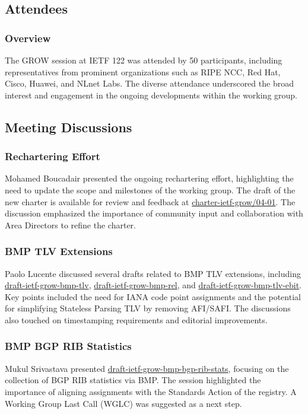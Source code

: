 \documentclass{article}
\begin{document}
\subsection{Attendees}
\subsubsection{Overview}
The GROW session at IETF 122 was attended by 50 participants, including representatives from prominent organizations such as RIPE NCC, Red Hat, Cisco, Huawei, and NLnet Labs. The diverse attendance underscored the broad interest and engagement in the ongoing developments within the working group.

\subsection{Meeting Discussions}

\subsubsection{Rechartering Effort}
Mohamed Boucadair presented the ongoing rechartering effort, highlighting the need to update the scope and milestones of the working group. The draft of the new charter is available for review and feedback at \href{https://datatracker.ietf.org/doc/charter-ietf-grow/04-01/}{charter-ietf-grow/04-01}. The discussion emphasized the importance of community input and collaboration with Area Directors to refine the charter.

\subsubsection{BMP TLV Extensions}
Paolo Lucente discussed several drafts related to BMP TLV extensions, including \href{https://datatracker.ietf.org/doc/html/draft-ietf-grow-bmp-tlv}{draft-ietf-grow-bmp-tlv}, \href{https://datatracker.ietf.org/doc/html/draft-ietf-grow-bmp-rel}{draft-ietf-grow-bmp-rel}, and \href{https://datatracker.ietf.org/doc/html/draft-ietf-grow-bmp-tlv-ebit}{draft-ietf-grow-bmp-tlv-ebit}. Key points included the need for IANA code point assignments and the potential for simplifying Stateless Parsing TLV by removing AFI/SAFI. The discussions also touched on timestamping requirements and editorial improvements.

\subsubsection{BMP BGP RIB Statistics}
Mukul Srivastava presented \href{https://datatracker.ietf.org/doc/html/draft-ietf-grow-bmp-bgp-rib-stats}{draft-ietf-grow-bmp-bgp-rib-stats}, focusing on the collection of BGP RIB statistics via BMP. The session highlighted the importance of aligning assignments with the Standards Action of the registry. A Working Group Last Call (WGLC) was suggested as a next step.
\end{document}
